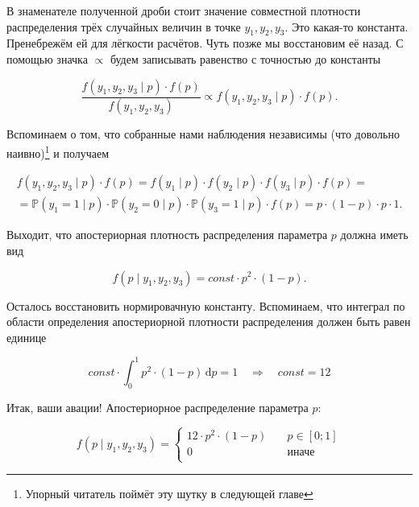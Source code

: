 \documentclass[12pt, a4paper, oneside]{extreport}
\def \mbb{\mathbb}
\def \PP{\mbb{P}}
\newcommand{\dx}[1]{\,\mathrm{d}#1} %
\theoremstyle{plain}              %
\theoremstyle{definition}         %
\begin{document}
В знаменателе полученной дроби стоит значение совместной плотности распределения трёх случайных величин в точке $y_1, y_2, y_3$. Это какая-то константа. Пренебрежём ей для лёгкости расчётов. Чуть позже мы восстановим её назад. С помощью значка $\propto$ будем записывать равенство с точностью до константы

\[  \frac{f(y_1,y_2,y_3 \mid p) \cdot f(p)}{f(y_1,y_2,y_3)} \propto f(y_1,y_2,y_3 \mid p) \cdot f(p).\]

Вспоминаем о том, что собранные нами наблюдения независимы (что довольно наивно)\footnote{Упорный читатель поймёт эту шутку в следующей главе} и получаем

\begin{multline*}
f(y_1,y_2,y_3 \mid p) \cdot f(p) =  f(y_1 \mid p) \cdot f(y_2 \mid p) \cdot f(y_3 \mid p) \cdot f(p) = \\ = \PP(y_1 = 1 \mid p) \cdot \PP(y_2 = 0 \mid p) \cdot \PP(y_3 = 1 \mid p) \cdot f(p) = p \cdot (1 - p) \cdot p \cdot 1.
\end{multline*}

Выходит, что апостериорная плотность распределения параметра $p$ должна иметь вид

\[ f(p \mid y_1, y_2, y_3) = const \cdot p^2 \cdot (1-p).\]

Осталось восстановить нормировачную константу. Вспоминаем, что интеграл по области определения апостериорной плотности распределения должен быть равен единице


\[ const \cdot \int_0^1 p^2 \cdot (1-p) \dx{p}  = 1 \quad \Rightarrow \quad const = 12 \]

Итак, ваши авации! Апостериорное распределение параметра $p$:


\[ f(p \mid y_1, y_2, y_3) =
  \begin{cases}
    12 \cdot p^2 \cdot (1-p)   & \quad p \in [0;1] \\
    0      & \quad \text{иначе}\\
  \end{cases}
\]
\end{document}
